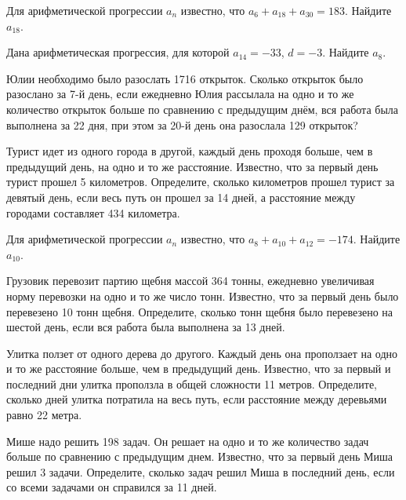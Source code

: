 \documentclass[4apaper]{article}
\begin{document}
\begin{taskBN}{31}
Для арифметической прогрессии ${a_n}$ известно, что $a_{6} + a_{18} + a_{30}= 183$. Найдите $a_{18}$.
\end{taskBN}

\begin{taskBN}{32}
Дана арифметическая прогрессия, для которой $a_{14} = -33$, $d=-3$. Найдите $a_{8}$.
\end{taskBN}

\begin{taskBN}{33}
Юлии необходимо было разослать 1716 открыток. Сколько открыток было разослано за 7-й день, если ежедневно Юлия рассылала на одно и то же количество открыток больше по сравнению с предыдущим днём, вся работа была выполнена за 22 дня, при этом за 20-й день она разослала 129 открыток? 
\end{taskBN}

\begin{taskBN}{34}
Турист идет из одного города в другой, каждый день проходя больше, чем в предыдущий день, на одно и то же расстояние. Известно, что за первый день турист прошел 5 километров. Определите, сколько километров прошел турист за девятый день, если весь путь он прошел за 14 дней, а расстояние между городами составляет 434 километра.
\end{taskBN}

\begin{taskBN}{35}
Для арифметической прогрессии ${a_n}$ известно, что $a_{8} + a_{10} + a_{12}= -174$. Найдите $a_{10}$.
\end{taskBN}

\begin{taskBN}{36}
Грузовик перевозит партию щебня массой 364 тонны, ежедневно увеличивая норму перевозки на одно и то же число тонн. Известно, что за первый день было перевезено 10 тонн щебня. Определите, сколько тонн щебня было перевезено на шестой день, если вся работа была выполнена за 13 дней.
\end{taskBN}

\begin{taskBN}{37}
 Улитка ползет от одного дерева до другого. Каждый день она проползает на одно и то же расстояние больше, чем в предыдущий день. Известно, что за первый и последний дни улитка проползла в общей сложности 11 метров. Определите, сколько дней улитка потратила на весь путь, если расстояние между деревьями равно 22 метра.
\end{taskBN}

\begin{taskBN}{38}
Мише надо решить 198 задач. Он решает на одно и то же количество задач больше по сравнению с предыдущим днем. Известно, что за первый день Миша решил 3 задачи. Определите, сколько задач решил Миша в последний день, если со всеми задачами он справился за 11 дней.
\end{taskBN}
\end{document}
